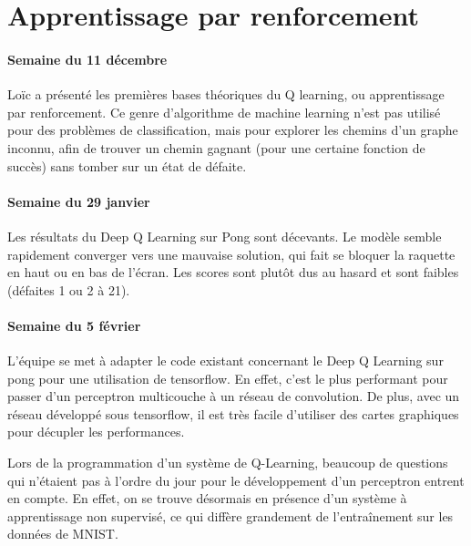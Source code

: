 \documentclass[
    10pt,
    a4paper,
    oneside,
    headinclude,footinclude,
    BCOR=5mm,
    captions=tableabove
]{scrartcl}
\begin{document}
\section{Apprentissage par renforcement}

\paragraph{Semaine du 11 décembre}

Loïc a présenté les premières bases théoriques du Q learning, ou apprentissage par renforcement. Ce genre d'algorithme de machine learning n'est pas utilisé pour des problèmes de classification, mais pour explorer les chemins d'un graphe inconnu, afin de trouver un chemin gagnant (pour une certaine fonction de succès) sans tomber sur un état de défaite.

\paragraph{Semaine du 29 janvier}

Les résultats du Deep Q Learning sur Pong sont décevants. Le modèle semble rapidement converger vers une mauvaise solution, qui fait se bloquer la raquette en haut ou en bas de l'écran. Les scores sont plutôt dus au hasard et sont faibles (défaites 1 ou 2 à 21).

\paragraph{Semaine du 5 février}

L'équipe se met à adapter le code existant concernant le Deep Q Learning sur pong pour une utilisation de tensorflow. En effet, c'est le plus performant pour passer d'un perceptron multicouche à un réseau de convolution. De plus, avec un réseau développé sous tensorflow, il est très facile d'utiliser des cartes graphiques pour décupler les performances.

Lors de la programmation d'un système de Q-Learning, beaucoup de questions qui n'étaient pas à l'ordre du jour pour le développement d'un perceptron entrent en compte. En effet, on se trouve désormais en présence d'un système à apprentissage non supervisé, ce qui diffère grandement de l'entraînement sur les données de MNIST.

\renewcommand{\refname}{\spacedlowsmallcaps{References}} %

\end{document}
